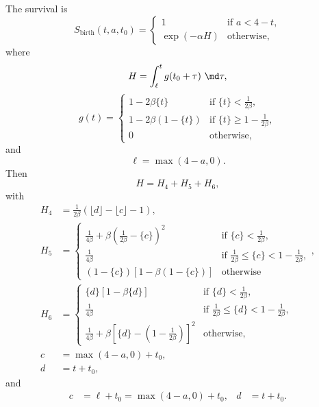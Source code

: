 \documentclass{jpmarticle}
\begin{document}
The survival is
\begin{equation}
  S_{\text{birth}}(t, a, t_0) =
  \begin{cases}
    1 & \text{if $a < 4 - t$},
    \\
    \exp(-\alpha H) & \text{otherwise},
  \end{cases}
\end{equation}
where
\begin{equation}
  H = \int_{\ell}^t g(t_0 + \tau)~\md \tau,
\end{equation}
\begin{equation}
  g (t) =
  \begin{cases}
    1 - 2 \beta \{t\}
    & \text{if $\{t\} < \frac{1}{2 \beta}$},
    \\
    1 - 2 \beta (1 - \{t\})
    & \text{if $\{t\} \geq 1 - \frac{1}{2 \beta}$},
    \\
    0 & \text{otherwise},
  \end{cases}
\end{equation}
and
\begin{equation}
  \ell = \max(4 - a, 0).
\end{equation}
Then
\begin{equation}
  H = H_4 + H_5 + H_6,
\end{equation}
with
\begin{align}
  H_4 &= \frac{1}{2 \beta}
  \left(\lfloor d \rfloor - \lfloor c \rfloor - 1\right),
  \\
  H_5 &=
  \begin{cases}
    \frac{1}{4 \beta}
    + \beta \left(\frac{1}{2 \beta} - \{c\}\right)^2
    & \text{if $\{c\} < \frac{1}{2 \beta}$},
    \\
    \frac{1}{4 \beta}
    & \text{if $\frac{1}{2 \beta} \leq \{c\} < 1 - \frac{1}{2 \beta}$},
    \\
    \left(1 - \{c\}\right) \left[1 -
      \beta \left(1 - \{c\}\right)\right]
    & \text{otherwise}
  \end{cases},
  \\
  H_6 &=
  \begin{cases}
    \{d\} \left[1 - \beta \{d\}\right]
    & \text{if $\{d\} < \frac{1}{2 \beta}$},
    \\
    \frac{1}{4 \beta}
    & \text{if $\frac{1}{2 \beta} \leq \{d\} <
      1 - \frac{1}{2 \beta}$},
    \\
    \frac{1}{4 \beta}
    + \beta
    \left[\{d\} - \left(1 - \frac{1}{2 \beta}\right)\right]^2
    & \text{otherwise},
  \end{cases}
  \\
  c &= \max(4 - a, 0) + t_0,
  \\
  d &= t + t_0,
\end{align}
and
\begin{align}
  c &= \ell + t_0 = \max(4 - a, 0) + t_0,
  &
  d &= t + t_0.
\end{align}
\end{document}
